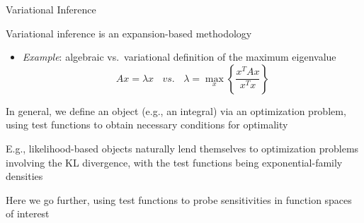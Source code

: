 \begin{frame}{Variational Inference \citep{jordan:1998:variational}}

Variational inference is an {\color{blue} expansion-based methodology}

\begin{itemize}
\item \emph{Example}: algebraic vs.\ variational definition of the maximum eigenvalue
\[
A x = \lambda x
\ \ \ \ vs.\ \ \ \
\lambda = \max_x \left\{ \frac{x^T A x}{x^T x} \right\}
\]
\end{itemize}

In general, we define an object (e.g., an integral) via an {\color{blue} optimization problem}, using {\color{blue} test functions} to obtain necessary conditions for optimality

E.g., likelihood-based objects naturally lend themselves to optimization problems involving the KL divergence, with the test functions being exponential-family densities

Here we go further, using test functions to probe sensitivities in function spaces of interest

\end{frame}


